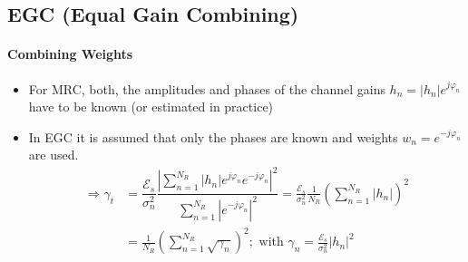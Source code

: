 \documentclass[a4paper, 10pt]{article}
\begin{document}
\subsection{EGC (Equal Gain Combining)}

\paragraph*{Combining Weights}
\begin{itemize}
	\item For MRC, both, the amplitudes and phases of the channel gains $h_n=|h_n|e^{j\varphi_n}$ have to be known (or estimated in practice)
	\item In EGC it is assumed that only the phases are known and weights $w_n=e^{-j\varphi_n}$ are used.
\begin{align*}
	\Rightarrow \gamma_t &=\dfrac{\mathcal{E}_s}{\sigma_n^2}\dfrac{\left|\sum\limits_{n=1}^{N_R}|h_n|e^{j\varphi_n}e^{-j\varphi_n}\right|^2}{\sum\limits^{N_R}_{n=1}\left|e^{-j\varphi_n}\right|^2}
	=\frac{\mathcal{E}_s}{\sigma_n^2}\frac{1}{N_R}\left(\sum\limits^{N_R}_{n=1}|h_n|\right)^2\\
	&=\frac{1}{N_R}\left(\sum\limits_{n=1}^{N_R}\sqrt{\gamma_n}\right)^2;\text{  with  }\gamma_n=\frac{\mathcal{E}_s}{\sigma_n^2}|h_n|^2
\end{align*}
\end{itemize}
\end{document}
